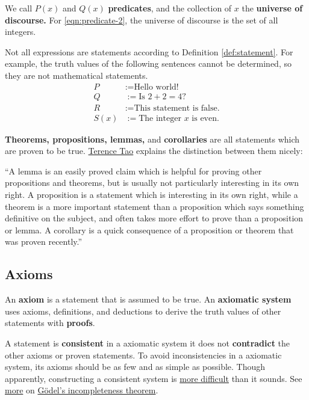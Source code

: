 \documentclass{article}[12pt]
\begin{document}
            
            We call $P(x)$ and $Q(x)$ \textbf{predicates}, and the collection of $x$ the \textbf{universe of discourse.} For \eqref{eqn:predicate-2}, the universe of discourse is the set of all integers.
            
            Not all expressions are statements according to Definition \ref{def:statement}. For example, the truth values of the following sentences cannot be determined, so they are not mathematical statements.
            \begin{align}
                P &:= \text{Hello world!}
                \\
                Q &:= \text{Is $2 + 2 = 4$?}
                \\
                R &:= \text{This statement is false.}
                \\
                S(x) &:= \text{The integer $x$ is even.}
            \end{align}
            
            \textbf{Theorems, propositions, lemmas,} and \textbf{corollaries} are all statements which are proven to be true. \href{https://youtu.be/MXJ-zpJeY3E}{Terence Tao} explains the distinction between them nicely:
            \begin{displayquote}
                ``A lemma is an easily proved claim which is helpful for proving other propositions and theorems, but is usually not particularly interesting in its own right. A proposition is a statement which is interesting in its own right, while a theorem is a more important statement than a proposition which says something definitive on the subject, and often takes more effort to prove than a proposition or lemma. A corollary is a quick consequence of a proposition or theorem that was proven recently.''\cite{tao-book}
            \end{displayquote}
            
        \subsection{Axioms}
        
            An \textbf{axiom} is a statement that is assumed to be true. An \textbf{axiomatic system} uses axioms, definitions, and deductions to derive the truth values of other statements with \textbf{proofs}.
            
            A statement is \textbf{consistent} in a axiomatic system it does not \textbf{contradict} the other axioms or proven statements. To avoid inconsistencies in a axiomatic system, its axioms should be as few and as simple as possible. Though apparently, constructing a consistent system is \href{https://youtu.be/2YIKpHxitNk?t=192}{more difficult} than it sounds.\cite{rayo-mit} See \href{https://www.youtube.com/watch?v=I4pQbo5MQOs}{more} on \href{https://www.youtube.com/watch?v=O4ndIDcDSGc}{Gödel's incompleteness theorem}.
    
\end{document}
